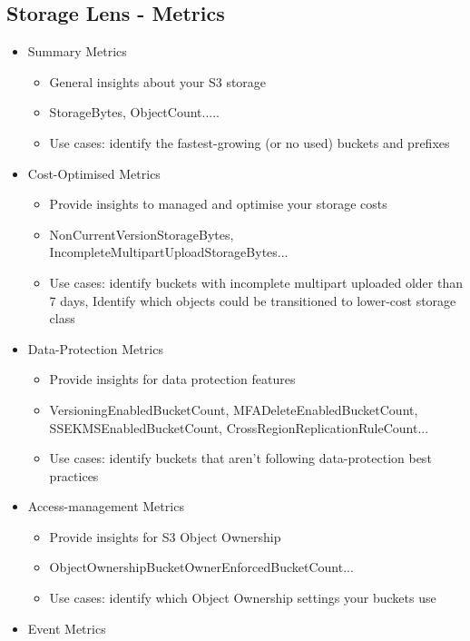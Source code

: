 \subsection{Storage Lens - Metrics}
\begin{itemize}
    \item Summary Metrics
    \begin{itemize}
        \item General insights about your S3 storage
        \item StorageBytes, ObjectCount.....
        \item Use cases: identify the fastest-growing (or no used) buckets and prefixes
    \end{itemize}
    \item Cost-Optimised Metrics
    \begin{itemize}
        \item Provide insights to managed and optimise your storage costs
        \item NonCurrentVersionStorageBytes, IncompleteMultipartUploadStorageBytes...
        \item Use cases: identify buckets with incomplete multipart uploaded older than 7 days, Identify which objects could be transitioned to lower-cost storage class
    \end{itemize}
    \item Data-Protection Metrics
    \begin{itemize}
        \item Provide insights for data protection features
        \item VersioningEnabledBucketCount, MFADeleteEnabledBucketCount, SSEKMSEnabledBucketCount, CrossRegionReplicationRuleCount...
        \item Use cases: identify buckets that aren't following data-protection best practices
    \end{itemize}
    \item Access-management Metrics
    \begin{itemize}
        \item Provide insights for S3 Object Ownership
        \item ObjectOwnershipBucketOwnerEnforcedBucketCount...
        \item Use cases: identify which Object Ownership settings your buckets use
    \end{itemize}
    \item Event Metrics
    \begin{itemize}

\end{itemize}
\end{itemize}
